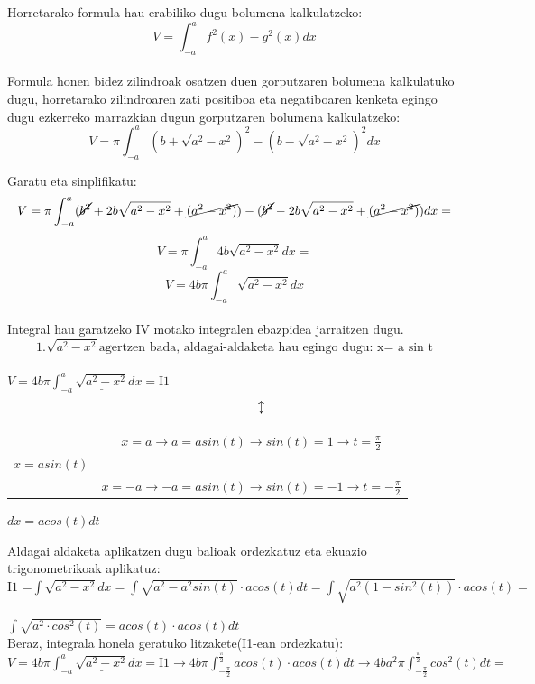     
Horretarako formula hau erabiliko dugu bolumena kalkulatzeko:\\

$$V=\int_{-a}^{a} f^2(x)-g^2(x) dx$$\\
Formula honen bidez zilindroak osatzen duen gorputzaren bolumena kalkulatuko dugu, horretarako zilindroaren  zati positiboa eta negatiboaren kenketa egingo dugu ezkerreko marrazkian dugun gorputzaren bolumena kalkulatzeko:
$$V= \pi \int_{-a}^{a} (b+\sqrt{a^2-x^2})^2-(b-\sqrt{a^2-x^2})^2 dx$$

Garatu eta sinplifikatu:
$$V= \pi \int_{-a}^{a} (\cancel{b^2}+2b\sqrt{a^2-x^2}+\cancel{(a^2-x^2)})-(\cancel{b^2}-2b\sqrt{a^2-x^2}+\cancel{(a^2-x^2)}) dx=$$
$$V= \pi \int_{-a}^{a} 4b\sqrt{a^2-x^2} dx=  $$$$V= 4b\pi \int_{-a}^{a} \sqrt{a^2-x^2} dx$$\\
 
 Integral hau garatzeko IV motako integralen ebazpidea jarraitzen dugu.\\
 $$\text{1.}\sqrt{a^2-x^2} \text{agertzen bada, aldagai-aldaketa hau egingo dugu: x= a sin t}$$\\
 \centering$V= 4b\pi \int_{-a}^{a}\underline{\sqrt{a^2-x^2}}   dx =\text{I1} $\\
 
 $$  \hspace{1.5cm}                   \updownarrow$$
  

\begin{center}
\begin{tabular}{ c c  }
  &  $x=a \rightarrow a = a sin (t) \rightarrow sin(t)=1 \rightarrow \boxed{t=\frac{\pi}{2} }$  \\ 
 $x= a sin (t)$ &  \\  
  &  $x=-a \rightarrow -a = a sin (t) \rightarrow sin(t)=-1 \rightarrow \boxed{t=-\frac{\pi}{2}} $     
\end{tabular}
\end{center}

$dx = acos(t) dt$                         


 \newpage
 Aldagai aldaketa aplikatzen dugu balioak ordezkatuz eta ekuazio trigonometrikoak aplikatuz:
 \\
 \vspace{1cm}
 $ \text{I1 =}  \int\sqrt{a^2-x^2} dx = \int\sqrt{a^2-a^2sin(t)} \cdot acos(t) dt= \int\sqrt{a^2(1-sin^2(t))} \cdot acos(t)=   $
  
   \vspace{1cm}
 $\int\sqrt{a^2\cdot cos^2(t)}= acos(t) \cdot acos(t) dt   $
  \vspace{1cm}\\
Beraz, integrala honela geratuko litzakete(I1-ean ordezkatu):\\
 \vspace{1cm}
$V= 4b\pi \int_{-a}^{a}\underline{\sqrt{a^2-x^2}}   dx =\text{I1} \longrightarrow 4b\pi\int_{-\frac{\pi}{2}}^{\frac{\pi}{2}}acos(t) \cdot acos(t) dt \longrightarrow 4ba^2\pi\int_{-\frac{\pi}{2}}^{\frac{\pi}{2}} cos^2(t)dt =$\\
\vspace{1cm}


